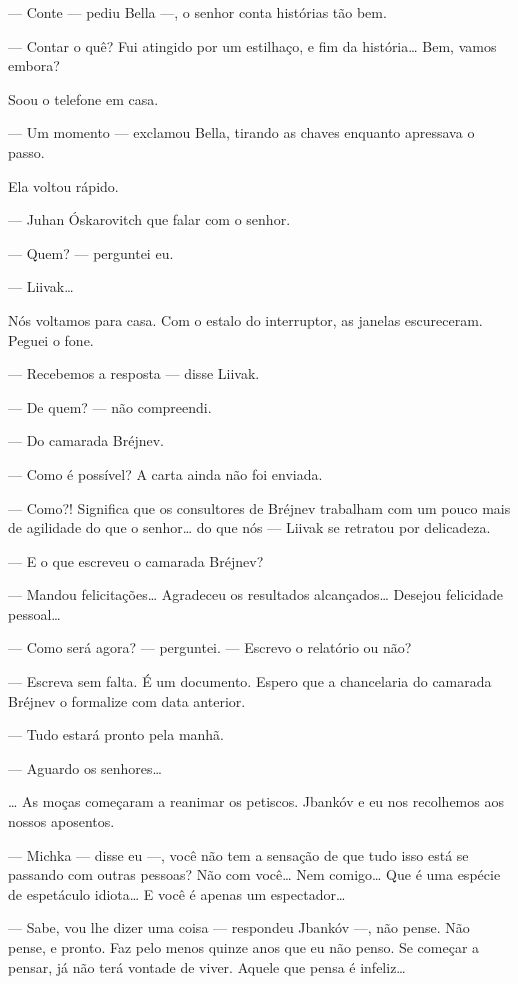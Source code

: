 --- Conte --- pediu Bella ---, o senhor conta
histórias tão bem.

--- Contar o quê? Fui atingido por um estilhaço, e fim da
história\ldots{} Bem, vamos embora?

Soou o telefone em casa.

--- Um momento --- exclamou Bella, tirando as chaves
enquanto apressava o passo.

Ela voltou rápido.

--- Juhan Óskarovitch que falar com o senhor.

--- Quem? --- perguntei eu.

--- Liivak\ldots{}

Nós voltamos para casa. Com o estalo do interruptor, as janelas
escureceram. Peguei o fone.

--- Recebemos a resposta --- disse Liivak.

--- De quem? --- não compreendi.

--- Do camarada Bréjnev.

--- Como é possível? A carta ainda não foi enviada.

--- Como?! Significa que os consultores de Bréjnev trabalham com
um pouco mais de agilidade do que o senhor\ldots{} do que nós ---
Liivak se retratou por delicadeza.

--- E o que escreveu o camarada Bréjnev?

--- Mandou felicitações\ldots{} Agradeceu os resultados alcançados\ldots{}
Desejou felicidade pessoal\ldots{}

--- Como será agora? --- perguntei. --- Escrevo o
relatório ou não?

--- Escreva sem falta. É um documento. Espero que a chancelaria
do camarada Bréjnev o formalize com data anterior.

--- Tudo estará pronto pela manhã.

--- Aguardo os senhores\ldots{}

\ldots{} As moças começaram a reanimar os petiscos. Jbankóv e eu nos
recolhemos aos nossos aposentos.

--- Michka --- disse eu ---, você não tem a sensação
de que tudo isso está se passando com outras pessoas? Não com você\ldots{}
Nem comigo\ldots{} Que é uma espécie de espetáculo idiota\ldots{} E você é apenas um espectador\ldots{}

--- Sabe, vou lhe dizer uma coisa --- respondeu Jbankóv
---, não pense. Não pense, e pronto. Faz pelo menos quinze anos
que eu não penso. Se começar a pensar, já não terá vontade de viver.
Aquele que pensa é infeliz\ldots{}

